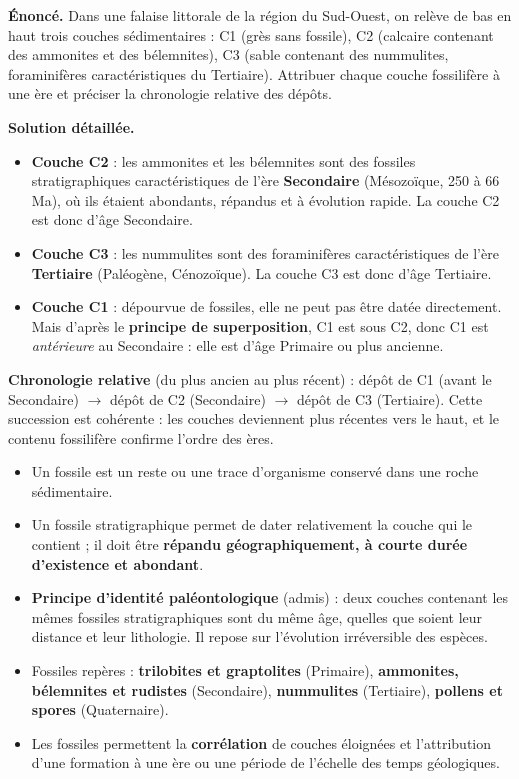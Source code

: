 \documentclass[11pt]{article}
\newcommand{\cle}[1]{{\popxbold\color{popdark}#1}}
\begin{document}
\begin{exoresolu}
\textbf{Énoncé.} Dans une falaise littorale de la région du Sud-Ouest, on relève de bas en haut trois couches sédimentaires : C1 (grès sans fossile), C2 (calcaire contenant des ammonites et des bélemnites), C3 (sable contenant des nummulites, foraminifères caractéristiques du Tertiaire). Attribuer chaque couche fossilifère à une ère et préciser la chronologie relative des dépôts.

\tcblower
\textbf{Solution détaillée.}
\begin{itemize}
\item \textbf{Couche C2} : les ammonites et les bélemnites sont des fossiles stratigraphiques caractéristiques de l'ère \textbf{Secondaire} (Mésozoïque, 250 à 66 Ma), où ils étaient abondants, répandus et à évolution rapide. La couche C2 est donc d'âge Secondaire.
\item \textbf{Couche C3} : les nummulites sont des foraminifères caractéristiques de l'ère \textbf{Tertiaire} (Paléogène, Cénozoïque). La couche C3 est donc d'âge Tertiaire.
\item \textbf{Couche C1} : dépourvue de fossiles, elle ne peut pas être datée directement. Mais d'après le \textbf{principe de superposition}, C1 est sous C2, donc C1 est \emph{antérieure} au Secondaire : elle est d'âge Primaire ou plus ancienne.
\end{itemize}
\textbf{Chronologie relative} (du plus ancien au plus récent) : dépôt de C1 (avant le Secondaire) $\rightarrow$ dépôt de C2 (Secondaire) $\rightarrow$ dépôt de C3 (Tertiaire). Cette succession est cohérente : les couches deviennent plus récentes vers le haut, et le contenu fossilifère confirme l'ordre des ères.
\end{exoresolu}

\begin{aretenir}
\begin{itemize}
\item Un \cle{fossile} est un reste ou une trace d'organisme conservé dans une roche sédimentaire.
\item Un \cle{fossile stratigraphique} permet de dater relativement la couche qui le contient ; il doit être \textbf{répandu géographiquement, à courte durée d'existence et abondant}.
\item \textbf{Principe d'identité paléontologique} (admis) : deux couches contenant les mêmes fossiles stratigraphiques sont du même âge, quelles que soient leur distance et leur lithologie. Il repose sur l'évolution irréversible des espèces.
\item Fossiles repères : \textbf{trilobites et graptolites} (Primaire), \textbf{ammonites, bélemnites et rudistes} (Secondaire), \textbf{nummulites} (Tertiaire), \textbf{pollens et spores} (Quaternaire).
\item Les fossiles permettent la \textbf{corrélation} de couches éloignées et l'attribution d'une formation à une ère ou une période de l'échelle des temps géologiques.
\end{itemize}
\end{aretenir}
\end{document}
